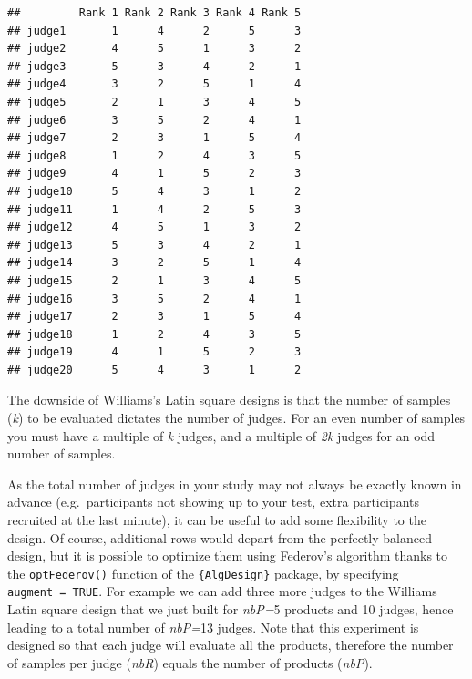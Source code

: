 \documentclass[
]{krantz}
\begin{document}
\begin{verbatim}
##         Rank 1 Rank 2 Rank 3 Rank 4 Rank 5
## judge1       1      4      2      5      3
## judge2       4      5      1      3      2
## judge3       5      3      4      2      1
## judge4       3      2      5      1      4
## judge5       2      1      3      4      5
## judge6       3      5      2      4      1
## judge7       2      3      1      5      4
## judge8       1      2      4      3      5
## judge9       4      1      5      2      3
## judge10      5      4      3      1      2
## judge11      1      4      2      5      3
## judge12      4      5      1      3      2
## judge13      5      3      4      2      1
## judge14      3      2      5      1      4
## judge15      2      1      3      4      5
## judge16      3      5      2      4      1
## judge17      2      3      1      5      4
## judge18      1      2      4      3      5
## judge19      4      1      5      2      3
## judge20      5      4      3      1      2
\end{verbatim}

The downside of Williams's Latin square designs is that the number of samples (\emph{k}) to be evaluated dictates the number of judges. For an even number of samples you must have a multiple of \emph{k} judges, and a multiple of \emph{2k} judges for an odd number of samples.

As the total number of judges in your study may not always be exactly known in advance (e.g.~participants not showing up to your test, extra participants recruited at the last minute), it can be useful to add some flexibility to the design. Of course, additional rows would depart from the perfectly balanced design, but it is possible to optimize them using Federov's algorithm thanks to the \texttt{optFederov()} function of the \texttt{\{AlgDesign\}} package, by specifying \texttt{augment\ =\ TRUE}. For example we can add three more judges to the Williams Latin square design that we just built for \emph{nbP=}5 products and 10 judges, hence leading to a total number of \emph{nbP=}13 judges. Note that this experiment is designed so that each judge will evaluate all the products, therefore the number of samples per judge (\emph{nbR}) equals the number of products (\emph{nbP}).
\end{document}
